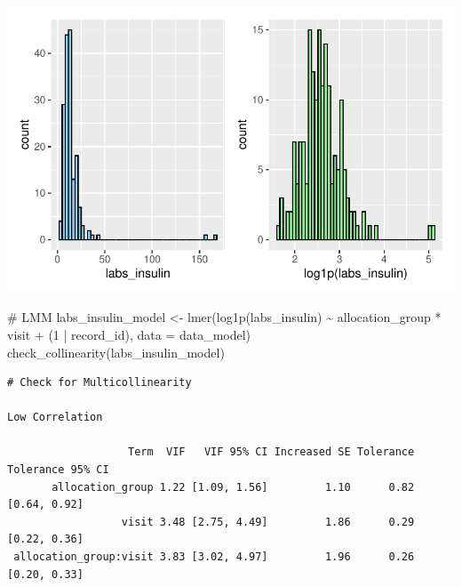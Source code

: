\documentclass[
  12pt,
]{article}
\newenvironment{Shaded}{\begin{snugshade}}{\end{snugshade}}
\newcommand{\AttributeTok}[1]{\textcolor[rgb]{0.40,0.45,0.13}{#1}}
\newcommand{\CommentTok}[1]{\textcolor[rgb]{0.37,0.37,0.37}{#1}}
\newcommand{\DecValTok}[1]{\textcolor[rgb]{0.68,0.00,0.00}{#1}}
\newcommand{\FunctionTok}[1]{\textcolor[rgb]{0.28,0.35,0.67}{#1}}
\newcommand{\NormalTok}[1]{\textcolor[rgb]{0.00,0.23,0.31}{#1}}
\newcommand{\OtherTok}[1]{\textcolor[rgb]{0.00,0.23,0.31}{#1}}
\newcommand{\SpecialCharTok}[1]{\textcolor[rgb]{0.37,0.37,0.37}{#1}}
\begin{document}
\includegraphics{Outcomes_files/figure-pdf/labs_insulin_1-1.pdf}

\begin{Shaded}
\begin{Highlighting}[]
\CommentTok{\# LMM}
\NormalTok{labs\_insulin\_model }\OtherTok{\textless{}{-}} \FunctionTok{lmer}\NormalTok{(}\FunctionTok{log1p}\NormalTok{(labs\_insulin) }\SpecialCharTok{\textasciitilde{}}\NormalTok{ allocation\_group }\SpecialCharTok{*}\NormalTok{ visit }\SpecialCharTok{+} 
\NormalTok{(}\DecValTok{1} \SpecialCharTok{|}\NormalTok{ record\_id), }\AttributeTok{data =}\NormalTok{ data\_model)}
\FunctionTok{check\_collinearity}\NormalTok{(labs\_insulin\_model)}
\end{Highlighting}
\end{Shaded}

\begin{verbatim}
# Check for Multicollinearity

Low Correlation

                   Term  VIF   VIF 95% CI Increased SE Tolerance Tolerance 95% CI
       allocation_group 1.22 [1.09, 1.56]         1.10      0.82     [0.64, 0.92]
                  visit 3.48 [2.75, 4.49]         1.86      0.29     [0.22, 0.36]
 allocation_group:visit 3.83 [3.02, 4.97]         1.96      0.26     [0.20, 0.33]
\end{verbatim}
\end{document}
